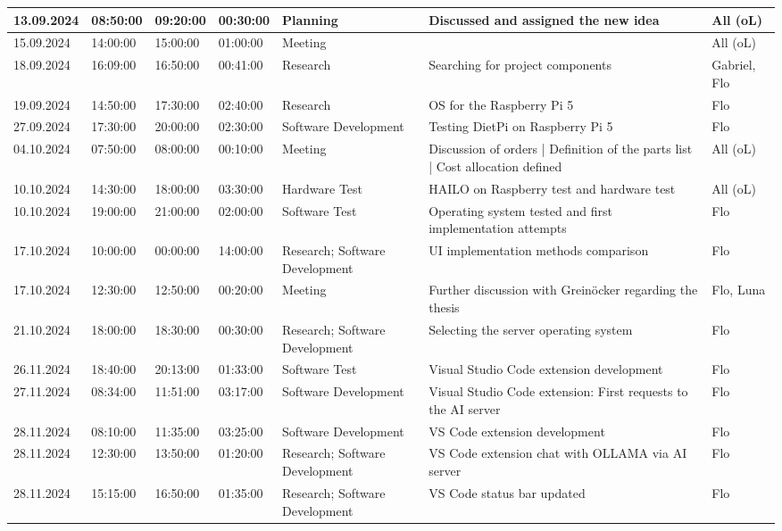 \begin{longtable}{@{}p{1.8cm} p{1.2cm} p{1.2cm} p{1.2cm} p{2cm} p{4.5cm} p{2cm}@{}}
    13.09.2024 & 08:50:00 & 09:20:00 & 00:30:00 & Planning & Discussed and assigned the new idea & All (oL) \\
    \hline
    15.09.2024 & 14:00:00 & 15:00:00 & 01:00:00 & Meeting & & All (oL) \\
    \hline
    18.09.2024 & 16:09:00 & 16:50:00 & 00:41:00 & Research & Searching for project components & Gabriel, Flo \\
    \hline
    19.09.2024 & 14:50:00 & 17:30:00 & 02:40:00 & Research & OS for the Raspberry Pi 5 & Flo \\
    \hline
    27.09.2024 & 17:30:00 & 20:00:00 & 02:30:00 & Software Development & Testing DietPi on Raspberry Pi 5 & Flo \\
    \hline
    04.10.2024 & 07:50:00 & 08:00:00 & 00:10:00 & Meeting & Discussion of orders | Definition of the parts list | Cost allocation defined & All (oL) \\
    \hline
    10.10.2024 & 14:30:00 & 18:00:00 & 03:30:00 & Hardware Test & HAILO on Raspberry test and hardware test & All (oL) \\
    \hline
    10.10.2024 & 19:00:00 & 21:00:00 & 02:00:00 & Software Test & Operating system tested and first implementation attempts & Flo \\
    \hline
    17.10.2024 & 10:00:00 & 00:00:00 & 14:00:00 & Research; Software Development & UI implementation methods comparison & Flo \\
    \hline
    17.10.2024 & 12:30:00 & 12:50:00 & 00:20:00 & Meeting & Further discussion with Greinöcker regarding the thesis & Flo, Luna \\
    \hline
    21.10.2024 & 18:00:00 & 18:30:00 & 00:30:00 & Research; Software Development & Selecting the server operating system & Flo \\
    \hline
    26.11.2024 & 18:40:00 & 20:13:00 & 01:33:00 & Software Test & Visual Studio Code extension development & Flo \\
    \hline
    27.11.2024 & 08:34:00 & 11:51:00 & 03:17:00 & Software Development & Visual Studio Code extension: First requests to the AI server & Flo \\
    \hline
    28.11.2024 & 08:10:00 & 11:35:00 & 03:25:00 & Software Development & VS Code extension development & Flo \\
    \hline
    28.11.2024 & 12:30:00 & 13:50:00 & 01:20:00 & Research; Software Development & VS Code extension chat with OLLAMA via AI server & Flo \\
    \hline
    28.11.2024 & 15:15:00 & 16:50:00 & 01:35:00 & Research; Software Development & VS Code status bar updated & Flo \\

\end{longtable}
